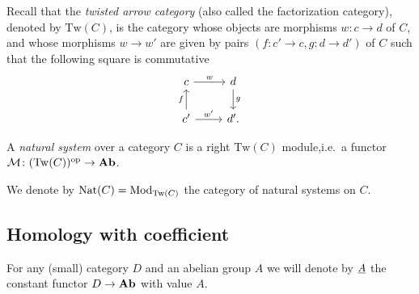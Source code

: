 \documentclass{amsart}
\newcommand{\M}{\mathcal{M}}
\newcommand{\Tw}[1]{\mathrm{Tw}(#1)}
\newcommand{\Nat}[1]{\mathrm{Nat}(#1)}
\begin{document}
\begin{paragr}
  Recall that the \emph{twisted arrow category} (also called the
  factorization category), denoted by $\Tw{C}$, is the category whose
  objects are morphisms $w \colon c \to d$ of $C$, and whose morphisms
  $w \to w'$ are given by pairs $(f\colon c' \to c,g\colon d \to d')$
  of $C$ such that the following square is commutative
  \[
    \begin{tikzcd}
      c \ar[r,"w"] & d \ar[d,"g"] \\
      c' \ar[u,"f"] \ar[r,"w'"] & d'.
    \end{tikzcd}
  \]
\end{paragr}
\begin{definition}
  A \emph{natural system} over a category $C$ is a right $\Tw{C}$
  module,i.e.\ a functor $\M \colon (\Tw{C})^{\op} \to \Ab$.
\end{definition}
We denote by $\Nat{C}=\RMod{\Tw{C}}$ the category of natural systems on $C$.
\subsection{Homology with coefficient}
\begin{paragr}
  For any (small) category $D$ and an abelian group $A$ we will denote by $\underline{A}$ the
  constant functor $D \to \mathbf{Ab}$ with value $A$.%
\end{paragr}
\end{document}

